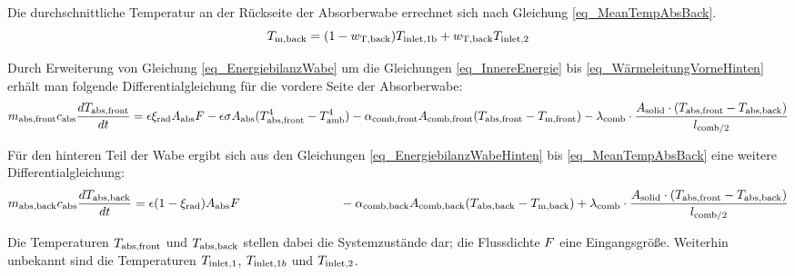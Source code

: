 Die durchschnittliche Temperatur an der Rückseite der Absorberwabe errechnet sich nach Gleichung \ref{eq_MeanTempAbsBack}.
\begin{equation} \label{eq_MeanTempAbsBack}
    T_{\mathrm{m,back}}  = (1-w_{\mathrm{T,back}}) T_{\mathrm{inlet,}\mathrm{1b}} + w_{\mathrm{T,back}} T_{\mathrm{inlet,}2}
\end{equation}

Durch Erweiterung von Gleichung \ref{eq_EnergiebilanzWabe} um die Gleichungen \ref{eq_InnereEnergie} bis \ref{eq_WärmeleitungVorneHinten} erhält man folgende Differentialgleichung für die vordere Seite der Absorberwabe:
\setlength{\eqlinespacing}{25pt}
\begin{dmath} \label{eq_GesamtgleichungEnergiebilanzWabeVorne}
    m_{\mathrm{abs,front}}  c_{\mathrm{abs}} \frac{d \TAbsorberFront}{d t} = \epsilon \xi_{\mathrm{rad}} \SurfaceFront \FluxSolar -  \epsilon \sigma \SurfaceFront (\TAbsorberFront^4-\TAmbient^4) - \HeatTransferCoefficientAbsorberFront \HeatTransferSurfaceFront (\TAbsorberFront-T_{\mathrm{m,front}}) - \lambda_{\mathrm{comb}} \cdot \frac{\SurfaceFrontSolid \cdot (\TAbsorberFront-\TAbsorberBack)}{l_{\mathrm{comb}/2}}
\end{dmath}

Für den hinteren Teil der Wabe ergibt sich aus den Gleichungen \ref{eq_EnergiebilanzWabeHinten} bis \ref{eq_MeanTempAbsBack} eine weitere Differentialgleichung:
\setlength{\eqlinespacing}{25pt}
\begin{dmath} \label{eq_GesamtgleichungEnergiebilanzWabeHinten}
    m_{\mathrm{abs,back}}  c_{\mathrm{abs}} \frac{d \TAbsorberBack}{d t} = \epsilon (1-\xi_{\mathrm{rad}}) \SurfaceFront \FluxSolar \qquad \qquad \qquad \qquad -  \HeatTransferCoefficientAbsorberBack \HeatTransferSurfaceBack (\TAbsorberBack-T_{\mathrm{m,back}}) + \lambda_{\mathrm{comb}} \cdot \frac{\SurfaceFrontSolid \cdot (\TAbsorberFront-\TAbsorberBack)}{l_{\mathrm{comb}/2}}
\end{dmath}


Die Temperaturen $T_{\mathrm{abs,front}}$ und $T_{\mathrm{abs,back}}$ stellen dabei die Systemzustände dar; die Flussdichte $F$ eine Eingangsgröße.
Weiterhin unbekannt sind die Temperaturen $T_{\mathrm{inlet,}1}$, $T_{\mathrm{inlet,}1b}$ und $T_{\mathrm{inlet,}2}$.

